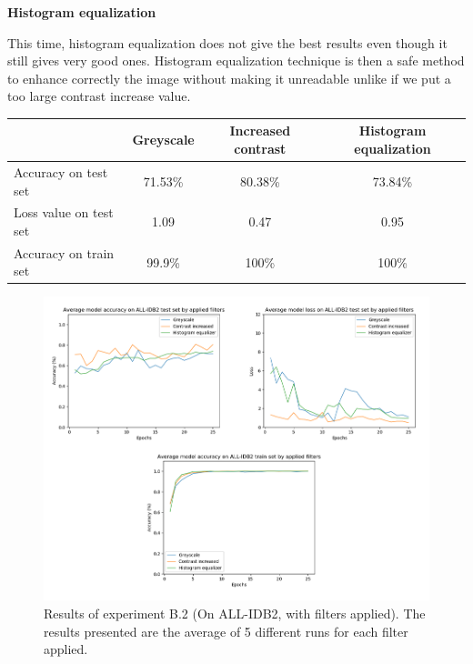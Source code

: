\documentclass[11pt, openany]{report}
\theoremstyle{plain}
\theoremstyle{definition}
\theoremstyle{remark}
\begin{document}
\textbf{Histogram equalization}

This time, histogram equalization does not give the best results even though it still gives very good ones. Histogram equalization technique is then a safe method to enhance correctly the image without making it unreadable unlike if we put a too large contrast increase value.

\vspace{1cm}

\begin{center}
\begin{tabular}{|l|c|c|c|}
  \hline
   & \textbf{Greyscale} & \textbf{Increased contrast} & \textbf{Histogram equalization} \\
  \hline
  Accuracy on test set & 71.53\% & 80.38\% & 73.84\% \\
  Loss value on test set & 1.09 & 0.47 &  0.95\\ 
  Accuracy on train set & 99.9\% & 100\% & 100\% \\ 
  \hline
\end{tabular}
\label{table:results-B2}
\end{center}

\newpage
\hspace*{0mm}\vfill
\begin{figure}[H]
  \centering
  \includegraphics[scale=0.5]{Code/ch6-LeukemiaSubtypes/figures_result/ALL_IDB2/all_idb2-filters.PNG}
  \caption{Results of experiment B.2 (On ALL-IDB2, with filters applied). The results presented are the average of 5 different runs for each filter applied.}
  \label{fig:results-B2}
\end{figure}
\vfill\hspace*{0mm}
\end{document}
